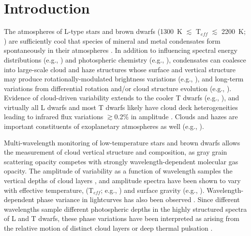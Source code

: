 \documentclass[twocolumn]{aastex6}
\newcommand{\teff}{T$_{eff}$}
\begin{document}



\section{Introduction}

The atmospheres of L-type stars and brown dwarfs (1300~K $\lesssim$ {\teff} $\lesssim$ 2200~K; \citealt{2015ApJ...810..158F}) are sufficiently cool that species of mineral and metal condensates form spontaneously in their atmospheres \citep{1996A&A...305L...1T,2010ApJ...716.1060V}.
In addition to influencing spectral energy distributions (e.g., \citealt{2001ApJ...556..357A,2008ApJ...674..451B}) and photospheric chemistry (e.g., \citealt{2000ApJ...531..438B}), condensates can coalesce into large-scale cloud and haze structures \citep{1989ApJ...338..314L,2001ApJ...556..872A,2014Natur.505..654C}
whose surface and vertical structure may produce rotationally-modulated brightness variations (e.g., \citealt{2012ApJ...750..105R}), and long-term variations from differential rotation and/or cloud structure evolution (e.g., \citealt{2009ApJ...701.1534A,2013A&A...555L...5G,2016ApJ...826....8Y}). Evidence of cloud-driven variability extends to the cooler T dwarfs (e.g., \citealt{2009ApJ...701.1534A,2012ApJ...760L..31B,2015ApJ...799..154M}), and virtually all L dwarfs and most T dwarfs likely have cloud deck heterogeneities leading to infrared flux variations $\gtrsim$0.2\% in amplitude \citep{2015ApJ...799..154M}. Clouds and hazes are important constituents of exoplanetary atmospheres as well (e.g., \citealt{2011ApJ...733...65B,2014Natur.505...69K,2016Natur.529...59S}).

Multi-wavelength monitoring of low-temperature stars and brown dwarfs allows the measurement of cloud vertical structure and composition, as gray grain scattering opacity competes with strongly wavelength-dependent molecular gas opacity. The amplitude of variability as a function of wavelength samples the vertical depths of cloud layers \citep{2013ApJ...768..121A}, and amplitude spectra have been shown to vary with effective temperature, ({\teff}; e.g., \citealt{2015ApJ...798L..13Y}) and surface gravity (e.g., \citealt{2016ApJ...829L..32L}). Wavelength-dependent phase variance in lightcurves has also been observed \citep{2012ApJ...760L..31B,2013ApJ...778L..10B,2016ApJ...826....8Y}. Since different wavelengths sample different photospheric depths in the highly structured spectra of L and T dwarfs, these phase variations have been interpreted as arising from the relative motion of distinct cloud layers or deep thermal pulsation \citep{2014ApJ...785..158R}. 
\end{document}

